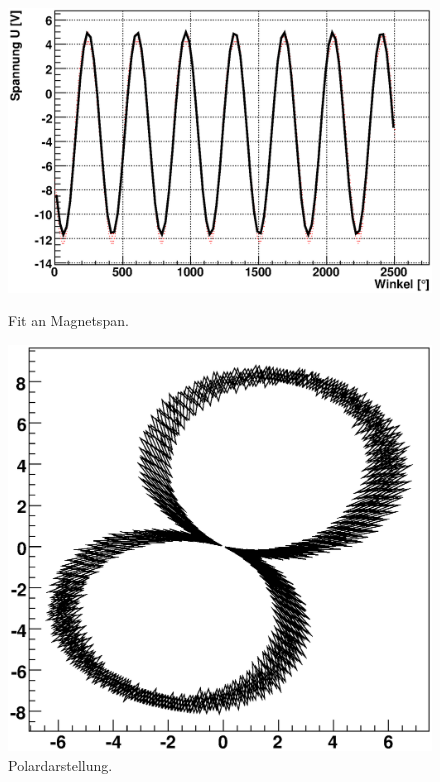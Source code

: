\documentclass[12pt]{article}
\begin{document}
\begin{figure}[H]  
\begin{minipage}{0.49\linewidth}
\centering
\includegraphics[width=0.9\linewidth]{pictures/magnetspan.eps}
\caption{Fit an Magnetspan.}
\end{minipage}
\begin{minipage}{0.5\linewidth}
\centering 
\includegraphics[width=0.9\linewidth]{pictures/magnetspanvd.eps}
\caption{Polardarstellung.}
\end{minipage}
\end{figure}
\end{document}
